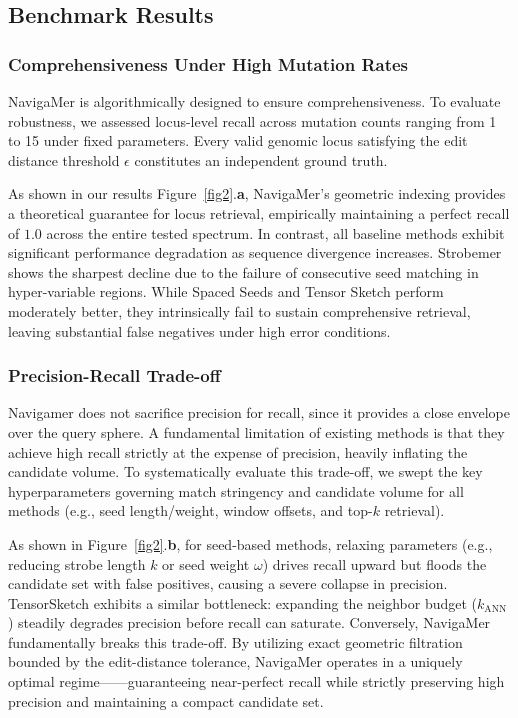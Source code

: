 \documentclass[unnumsec,webpdf,contemporary,large]{oup-authoring-template}%
\theoremstyle{thmstyleone}%
\theoremstyle{thmstyletwo}%
\theoremstyle{thmstylethree}%
\begin{document}

\subsection{Benchmark Results}

\subsubsection{Comprehensiveness Under High Mutation Rates}
NavigaMer is algorithmically designed to ensure comprehensiveness. To evaluate robustness, we assessed locus-level recall across mutation counts ranging from 1 to 15 under fixed parameters. Every valid genomic locus satisfying the edit distance threshold $\epsilon$ constitutes an independent ground truth. 

As shown in our results Figure~\ref{fig2}.\textbf{a}, NavigaMer's geometric indexing provides a theoretical guarantee for locus retrieval, empirically maintaining a perfect recall of $1.0$ across the entire tested spectrum. In contrast, all baseline methods exhibit significant performance degradation as sequence divergence increases. Strobemer shows the sharpest decline due to the failure of consecutive seed matching in hyper-variable regions. While Spaced Seeds and Tensor Sketch perform moderately better, they intrinsically fail to sustain comprehensive retrieval, leaving substantial false negatives under high error conditions.

\subsubsection{Precision-Recall Trade-off}
Navigamer does not sacrifice precision for recall, since it provides a close envelope over the query sphere. A fundamental limitation of existing methods is that they achieve high recall strictly at the expense of precision, heavily inflating the candidate volume. To systematically evaluate this trade-off, we swept the key hyperparameters governing match stringency and candidate volume for all methods (e.g., seed length/weight, window offsets, and top-$k$ retrieval). 

As shown in Figure~\ref{fig2}.\textbf{b}, for seed-based methods, relaxing parameters (e.g., reducing strobe length $k$ or seed weight $\omega$) drives recall upward but floods the candidate set with false positives, causing a severe collapse in precision. TensorSketch exhibits a similar bottleneck: expanding the neighbor budget ($k_{\mathrm{ANN}}$) steadily degrades precision before recall can saturate. Conversely, NavigaMer fundamentally breaks this trade-off. By utilizing exact geometric filtration bounded by the edit-distance tolerance, NavigaMer operates in a uniquely optimal regime——guaranteeing near-perfect recall while strictly preserving high precision and maintaining a compact candidate set.
\end{document}
